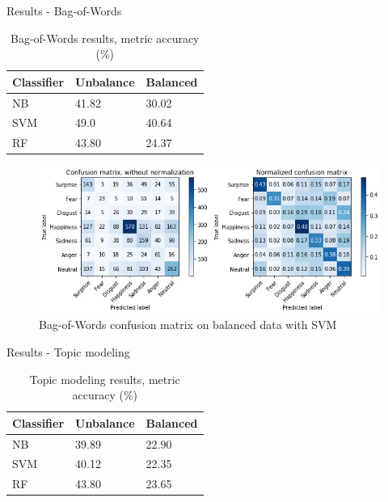 \documentclass{beamer}
\begin{document}
    

\begin{frame}{Results - Bag-of-Words}
    \begin{table}[h!]
\centering
\caption{Bag-of-Words results, metric accuracy (\%)} \label{tbl:bag-of-words-metric}
\begin{tabular}{|l|l|l|}
\hline
Classifier & Unbalance & Balanced \\ \hline
NB & 41.82 & 30.02 \\ \hline
SVM & 49.0 & 40.64 \\ \hline
RF & 43.80 & 24.37 \\ \hline
\end{tabular}
\end{table}

\begin{figure} [h!]
    \centering
    \includegraphics[width=.8\textwidth]{imgs/upsample-bow-svm.jpg}
    \caption{\tiny Bag-of-Words confusion matrix on balanced data with SVM}
    \label{fig:upsample-bow-svm}
\end{figure}

\end{frame}

\begin{frame}{Results - Topic modeling}
    \begin{table}[h!]
\centering
\caption{Topic modeling results, metric accuracy (\%)} \label{tbl:topic-modeling-metric}
\begin{tabular}{|l|l|l|}
\hline
Classifier & Unbalance & Balanced \\ \hline
NB & 39.89 & 22.90 \\ \hline
SVM & 40.12 & 22.35 \\ \hline
RF & 43.80 & 23.65 \\ \hline
\end{tabular}
\end{table}
\end{frame}
\end{document}
